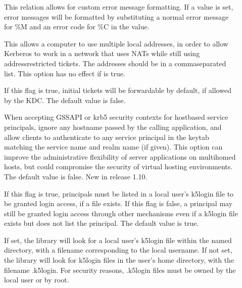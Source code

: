 \documentclass[letterpaper,10pt,english]{sphinxmanual}
\begin{document}
\begin{description}
\item[{}] \leavevmode
\sphinxAtStartPar
This relation allows for custom error message formatting.  If a
value is set, error messages will be formatted by substituting a
normal error message for \%M and an error code for \%C in the value.

\item[{}] \leavevmode
\sphinxAtStartPar
This allows a computer to use multiple local addresses, in order
to allow Kerberos to work in a network that uses NATs while still
using address\sphinxhyphen{}restricted tickets.  The addresses should be in a
comma\sphinxhyphen{}separated list.  This option has no effect if
 is true.

\item[{}] \leavevmode
\sphinxAtStartPar
If this flag is true, initial tickets will be forwardable by
default, if allowed by the KDC.  The default value is false.

\item[{}] \leavevmode
\sphinxAtStartPar
When accepting GSSAPI or krb5 security contexts for host\sphinxhyphen{}based
service principals, ignore any hostname passed by the calling
application, and allow clients to authenticate to any service
principal in the keytab matching the service name and realm name
(if given).  This option can improve the administrative
flexibility of server applications on multihomed hosts, but could
compromise the security of virtual hosting environments.  The
default value is false.  New in release 1.10.

\item[{}] \leavevmode
\sphinxAtStartPar
If this flag is true, principals must be listed in a local user’s
k5login file to be granted login access, if a 
file exists.  If this flag is false, a principal may still be
granted login access through other mechanisms even if a k5login
file exists but does not list the principal.  The default value is
true.

\item[{}] \leavevmode
\sphinxAtStartPar
If set, the library will look for a local user’s k5login file
within the named directory, with a filename corresponding to the
local username.  If not set, the library will look for k5login
files in the user’s home directory, with the filename .k5login.
For security reasons, .k5login files must be owned by
the local user or by root.


\end{description}
\end{document}
